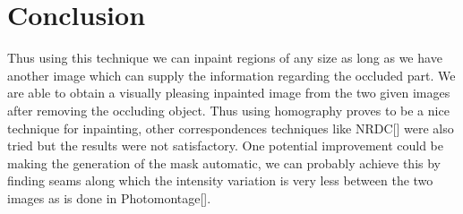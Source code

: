 \documentclass[conference]{IEEEtran}
\begin{document}
%






\section{Conclusion}
	Thus using this technique we can inpaint regions of any size as long as we have another image which can supply the information regarding the occluded part. We are able to obtain a visually pleasing inpainted image from the two given images after removing the occluding object. Thus  using homography 
proves to be a nice technique for inpainting, other correspondences techniques like NRDC[] were also tried but the results were not satisfactory. One potential improvement could be making the generation of the mask automatic, we can probably achieve this by finding seams along which the intensity variation is very less between the two images as is done in Photomontage[\cite{agarwala2004interactive}]. 
\end{document}
